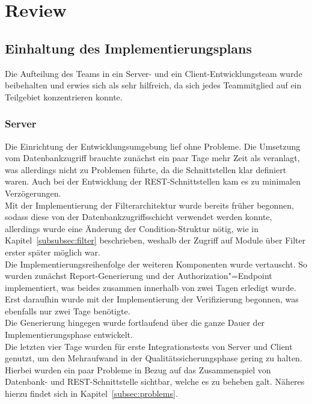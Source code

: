 \section{Review}
\subsection{Einhaltung des Implementierungsplans}
Die Aufteilung des Teams in ein Server- und ein Client-Entwicklungsteam wurde beibehalten und erwies sich als sehr hilfreich, da sich jedes Teammitglied auf ein Teilgebiet konzentrieren konnte.
\subsubsection{Server}
Die Einrichtung der Entwicklungsumgebung lief ohne Probleme. Die Umsetzung vom Datenbankzugriff brauchte zunächst ein paar Tage mehr Zeit als veranlagt, was allerdings nicht zu Problemen führte, da die Schnittstellen klar definiert waren. Auch bei der Entwicklung der REST-Schnittstellen kam es zu minimalen Verzögerungen.\\
 Mit der Implementierung der Filterarchitektur wurde bereits früher begonnen, sodass diese von der Datenbankzugriffsschicht verwendet werden konnte, allerdings wurde eine Änderung der Condition-Struktur nötig, wie in Kapitel~\ref{subsubsec:filter} beschrieben, weshalb der Zugriff auf Module über Filter erster später möglich war.\\
 Die Implementierungsreihenfolge der weiteren Komponenten wurde vertauscht. So wurden zunächst Report-Generierung und der Authorization"=Endpoint implementiert, was beides zusammen innerhalb von zwei Tagen erledigt wurde. Erst daraufhin wurde mit der Implementierung der Verifizierung begonnen, was ebenfalls nur zwei Tage benötigte. \\
 Die Generierung hingegen wurde fortlaufend über die ganze Dauer der Implementierungsphase entwickelt. \\
 Die letzten vier Tage wurden für erste Integrationstests von Server und Client genutzt, um den Mehraufwand in der Qualitätssicherungsphase gering zu halten. Hierbei wurden ein paar Probleme in Bezug auf das Zusammenspiel von Datenbank- und REST-Schnittstelle sichtbar, welche es zu beheben galt. Näheres hierzu findet sich in Kapitel~\ref{subsec:problems}.
 
 
